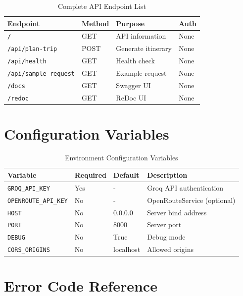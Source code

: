 \documentclass[12pt,a4paper]{report}
\begin{document}
\begin{table}[H]
\centering
\begin{tabular}{|l|l|p{6cm}|l|}
\hline
\textbf{Endpoint} & \textbf{Method} & \textbf{Purpose} & \textbf{Auth} \\
\hline
\texttt{/} & GET & API information & None \\
\hline
\texttt{/api/plan-trip} & POST & Generate itinerary & None \\
\hline
\texttt{/api/health} & GET & Health check & None \\
\hline
\texttt{/api/sample-request} & GET & Example request & None \\
\hline
\texttt{/docs} & GET & Swagger UI & None \\
\hline
\texttt{/redoc} & GET & ReDoc UI & None \\
\hline
\end{tabular}
\caption{Complete API Endpoint List}
\label{tab:api-endpoints-full}
\end{table}

\section{Configuration Variables}

\begin{table}[H]
\centering
\small
\begin{tabular}{|l|l|l|p{5cm}|}
\hline
\textbf{Variable} & \textbf{Required} & \textbf{Default} & \textbf{Description} \\
\hline
\texttt{GROQ\_API\_KEY} & Yes & - & Groq API authentication \\
\hline
\texttt{OPENROUTE\_API\_KEY} & No & - & OpenRouteService (optional) \\
\hline
\texttt{HOST} & No & 0.0.0.0 & Server bind address \\
\hline
\texttt{PORT} & No & 8000 & Server port \\
\hline
\texttt{DEBUG} & No & True & Debug mode \\
\hline
\texttt{CORS\_ORIGINS} & No & localhost & Allowed origins \\
\hline
\end{tabular}
\caption{Environment Configuration Variables}
\label{tab:config-vars}
\end{table}

\section{Error Code Reference}
\end{document}
